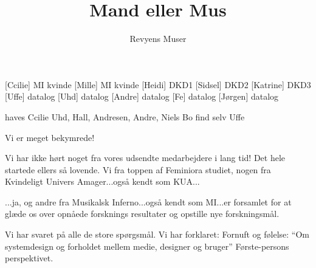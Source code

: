 \documentclass[a4paper,12pt]{article}
\title{Mand eller Mus}
\author{Revyens Muser}
\begin{document}
\maketitle

\begin{sketch}

\begin{roles}
  [Ccilie] MI kvinde
  [Mille] MI kvinde
  [Heidi] DKD1
  [Sidsel] DKD2
  [Katrine] DKD3
  [Uffe] datalog
  [Uhd] datalog
  [Andre] datalog
  [Fe] datalog
  [Jørgen] datalog
\end{roles}

\begin{props}
   haves
   Ccilie 
   Uhd, Hall, Andresen, Andre, Niels 
   Bo
   find selv
   Uffe
\end{props}


 Vi er meget bekymrede!

 Vi har ikke hørt noget fra vores udsendte medarbejdere i lang tid!
Det hele startede ellers så lovende. Vi fra toppen af Feminiora studiet, nogen
fra Kvindeligt Univers Amager...også kendt som KUA...

 ...ja, og andre fra Musikalsk Inferno...også kendt som
MI...er forsamlet for at glæde os over opnåede forsknings resultater
og opstille nye forskningsmål.



 Vi har svaret på alle de store spørgsmål. Vi har forklaret:
 Fornuft og følelse: ``Om systemdesign og
forholdet mellem medie, designer og bruger'' Første-persons
perspektivet.


\end{sketch}
\end{document}
